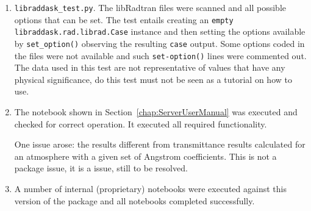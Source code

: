 \begin{enumerate}
\item \lstinline{libraddask_test.py}.  The libRadtran files were scanned and all possible options that can be set.  The test entails creating an \lstinline{empty libraddask.rad.librad.Case} instance and then setting the options available by \lstinline{set_option()} observing the resulting \lstinline{case} output.  Some options coded in the files were not available and such \lstinline{set-option()} lines were commented out.  The data used in this test are not representative of values that have any physical significance, do this test must not be seen as a tutorial on how to use.

\item 
The notebook shown in Section~\ref{chap:ServerUserManual} was executed and checked for correct operation.  It executed all required functionality.

One issue arose: the \libradtran{} results different from transmittance results calculated for an atmosphere with a given set of Angstrom coefficients.  This is not a package issue, it is a \libradtran{} issue, still to be resolved.

\item
A number of internal (proprietary) notebooks were executed against this version of the package and all notebooks completed successfully. 


\end{enumerate}
